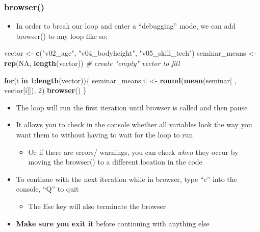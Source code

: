 \documentclass[
]{book}
\newenvironment{Shaded}{\begin{snugshade}}{\end{snugshade}}
\newcommand{\CommentTok}[1]{\textcolor[rgb]{0.56,0.35,0.01}{\textit{#1}}}
\newcommand{\ConstantTok}[1]{\textcolor[rgb]{0.56,0.35,0.01}{#1}}
\newcommand{\ControlFlowTok}[1]{\textcolor[rgb]{0.13,0.29,0.53}{\textbf{#1}}}
\newcommand{\DecValTok}[1]{\textcolor[rgb]{0.00,0.00,0.81}{#1}}
\newcommand{\FunctionTok}[1]{\textcolor[rgb]{0.13,0.29,0.53}{\textbf{#1}}}
\newcommand{\NormalTok}[1]{#1}
\newcommand{\OtherTok}[1]{\textcolor[rgb]{0.56,0.35,0.01}{#1}}
\newcommand{\SpecialCharTok}[1]{\textcolor[rgb]{0.81,0.36,0.00}{\textbf{#1}}}
\newcommand{\StringTok}[1]{\textcolor[rgb]{0.31,0.60,0.02}{#1}}
\providecommand{\tightlist}{%
  \setlength{\itemsep}{0pt}\setlength{\parskip}{0pt}}
\begin{document}
\subsubsection{browser()}\label{browser}

\begin{itemize}
\tightlist
\item
  In order to break our loop and enter a ``debugging'' mode, we can add browser() to any loop like so:
\end{itemize}

\begin{Shaded}
\begin{Highlighting}[]
\NormalTok{vector }\OtherTok{\textless{}{-}} \FunctionTok{c}\NormalTok{(}\StringTok{"v02\_age"}\NormalTok{, }\StringTok{"v04\_bodyheight"}\NormalTok{, }\StringTok{"v05\_skill\_tech"}\NormalTok{)}
\NormalTok{seminar\_means }\OtherTok{\textless{}{-}} \FunctionTok{rep}\NormalTok{(}\ConstantTok{NA}\NormalTok{, }\FunctionTok{length}\NormalTok{(vector)) }\CommentTok{\# create "empty" vector to fill}

\ControlFlowTok{for}\NormalTok{(i }\ControlFlowTok{in} \DecValTok{1}\SpecialCharTok{:}\FunctionTok{length}\NormalTok{(vector))\{}
\NormalTok{  seminar\_means[i] }\OtherTok{\textless{}{-}} \FunctionTok{round}\NormalTok{(}\FunctionTok{mean}\NormalTok{(seminar[ , vector[i]]), }\DecValTok{2}\NormalTok{)}
  \FunctionTok{browser}\NormalTok{()}
\NormalTok{\}}
\end{Highlighting}
\end{Shaded}

\begin{itemize}
\item
  The loop will run the first iteration until browser is called and then pause
\item
  It allows you to check in the console whether all variables look the way you want them to without having to wait for the loop to run

  \begin{itemize}
  \tightlist
  \item
    Or if there are errors/ warnings, you can check \emph{when} they occur by moving the browser() to a different location in the code
  \end{itemize}
\item
  To continue with the next iteration while in browser, type ``c'' into the console, ``Q'' to quit

  \begin{itemize}
  \tightlist
  \item
    The Esc key will also terminate the browser
  \end{itemize}
\item
  \textbf{Make sure you exit it} before continuing with anything else
\end{itemize}
\end{document}
